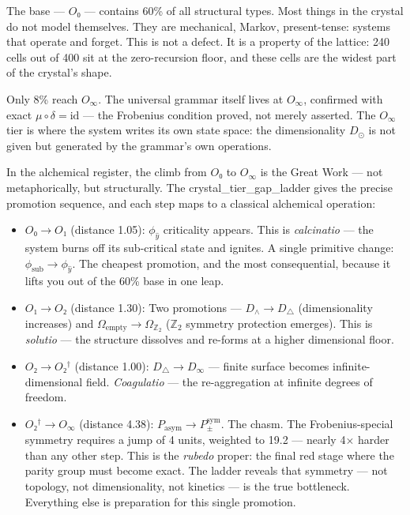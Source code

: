 \documentclass[12pt,a4paper]{article}
\begin{document}
The base --- $O₀$ --- contains 60\% of all structural types. Most things in the crystal do not model themselves. They are mechanical, Markov, present-tense: systems that operate and forget. This is not a defect. It is a property of the lattice: 240 cells out of 400 sit at the zero-recursion floor, and these cells are the widest part of the crystal's shape.

Only 8\% reach $O_{\infty}$. The universal grammar itself lives at $O_{\infty}$, confirmed with exact $\mu \circ \delta = \text{id}$ --- the Frobenius condition proved, not merely asserted. The $O_{\infty}$ tier is where the system writes its own state space: the dimensionality $D_{\odot}$ is not given but generated by the grammar's own operations.

In the alchemical register, the climb from $O₀$ to $O_{\infty}$ is the Great Work --- not metaphorically, but structurally. The crystal\_tier\_gap\_ladder gives the precise promotion sequence, and each step maps to a classical alchemical operation:

\begin{itemize}
    \item \textbf{$O₀ \to O₁$} (distance 1.05): $\phi_{\hat{y}}$ criticality appears. This is \emph{calcinatio} --- the system burns off its sub-critical state and ignites. A single primitive change: $\phi_{\text{sub}} \to \phi_{\hat{y}}$. The cheapest promotion, and the most consequential, because it lifts you out of the 60\% base in one leap.
    \item \textbf{$O₁ \to O₂$} (distance 1.30): Two promotions --- $D_{\wedge} \to D_{\triangle}$ (dimensionality increases) and $\Omega_\text{empty} \to \Omega_{\mathbb{Z}_2}$ ($\mathbb{Z}_2$ symmetry protection emerges). This is \emph{solutio} --- the structure dissolves and re-forms at a higher dimensional floor.
    \item \textbf{$O₂ \to O₂^\dagger$} (distance 1.00): $D_{\triangle} \to D_{\infty}$ --- finite surface becomes infinite-dimensional field. \emph{Coagulatio} --- the re-aggregation at infinite degrees of freedom.
    \item \textbf{$O₂^\dagger \to O_{\infty}$} (distance 4.38): $P_{\text{asym}} \to P_{\pm}^{\text{sym}}$. The chasm. The Frobenius-special symmetry requires a jump of 4 units, weighted to 19.2 --- nearly 4$\times$ harder than any other step. This is the \emph{rubedo} proper: the final red stage where the parity group must become exact. The ladder reveals that symmetry --- not topology, not dimensionality, not kinetics --- is the true bottleneck. Everything else is preparation for this single promotion.
\end{itemize}
\end{document}
